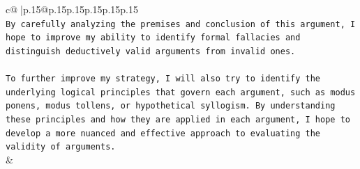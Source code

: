 \documentclass{article}
\begin{document}
{\begin{supertabular}{c@{$\;$}|p{.15\linewidth}@{}p{.15\linewidth}p{.15\linewidth}p{.15\linewidth}p{.15\linewidth}p{.15\linewidth}}
{{{\\ 
\texttt{By carefully analyzing the premises and conclusion of this argument, I hope to improve my ability to identify formal fallacies and distinguish deductively valid arguments from invalid ones.} \\
\\ 
\texttt{To further improve my strategy, I will also try to identify the underlying logical principles that govern each argument, such as modus ponens, modus tollens, or hypothetical syllogism. By understanding these principles and how they are applied in each argument, I hope to develop a more nuanced and effective approach to evaluating the validity of arguments.} \\
            }
        }
    }
    & \\ \\

\end{supertabular}
}
\end{document}
